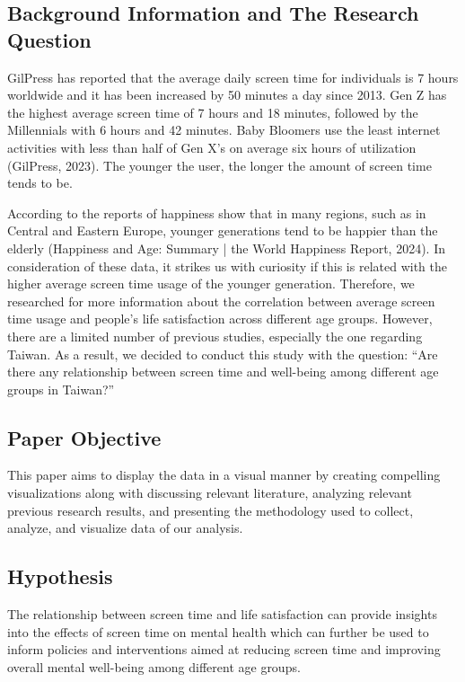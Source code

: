 \documentclass[12pt, a4paper]{article}
\begin{document}
\subsection*{Background Information and The Research Question}
\par GilPress has reported that the average daily screen time for individuals is 7 hours worldwide and it has been increased by 50 minutes a day since 2013. Gen Z has the highest average screen time of 7 hours and 18 minutes, followed by the Millennials with 6 hours and 42 minutes. Baby Bloomers use the least internet activities with less than half of Gen X’s on average six hours of utilization (GilPress, 2023). The younger the user, the longer the amount of screen time tends to be.
\par According to the reports of happiness show that in many regions, such as in Central and Eastern Europe, younger generations tend to be happier than the elderly (Happiness and Age: Summary | the World Happiness Report, 2024). In consideration of these data, it strikes us with curiosity if this is related with the higher average screen time usage of the younger generation. Therefore, we researched for more information about the correlation between average screen time usage and people’s life satisfaction across different age groups. However, there are a limited number of previous studies, especially the one regarding Taiwan. As a result, we decided to conduct this study with the question: “Are there any relationship between screen time and well-being among different age groups in Taiwan?”
\subsection*{Paper Objective}
\par This paper aims to display the data in a visual manner by creating compelling visualizations along with discussing relevant literature, analyzing relevant previous research results, and presenting the methodology used to collect, analyze, and visualize data of our analysis.

\subsection*{Hypothesis}
\par The relationship between screen time and life satisfaction can provide insights into the effects of screen time on mental health which can further be used to inform policies and interventions aimed at reducing screen time and improving overall mental well-being among different age groups.
\end{document}
